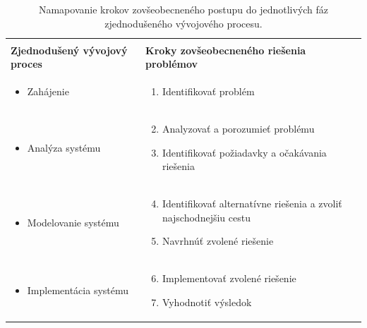 \begin{table}[ht]
	\begin{center}
		\begin{tabular}{| p{6cm} |p{8.5cm}|}
			\hline
			& \\
			\textbf{Zjednodušený vývojový proces} & 
			\textbf{Kroky zovšeobecneného riešenia problémov} \\ [2.5ex] 
			\hline\hline
			\begin{itemize}
				\item[] Zahájenie
			\end{itemize} & 
			\begin{enumerate}
				\item Identifikovať problém
			\end{enumerate} \\ 
			\hline
			\begin{itemize}
				\item[] Analýza systému
			\end{itemize} & 
			\begin{enumerate}
				\setcounter{enumi}{1}
				\item Analyzovať a porozumieť problému
				\item Identifikovať požiadavky a očakávania riešenia
			\end{enumerate} \\
			\hline
			\begin{itemize}
				\item[] Modelovanie systému
			\end{itemize} &  
			\begin{enumerate}
				\setcounter{enumi}{3}
				\item Identifikovať alternatívne riešenia a zvoliť najschodnejšiu cestu
				\item Navrhnúť zvolené riešenie
			\end{enumerate} \\
			\hline
			\begin{itemize}
				\item[] Implementácia systému
			\end{itemize} & 
			\begin{enumerate}
				\setcounter{enumi}{5}
				\item Implementovať zvolené riešenie
				\item Vyhodnotiť výsledok
			\end{enumerate} \\ [1ex] 
			\hline
		\end{tabular}
	\caption{Namapovanie krokov zovšeobecneného postupu do jednotlivých fáz zjednodušeného vývojového procesu.}
	\label{tab:map-steps}
	\end{center}

\end{table}

